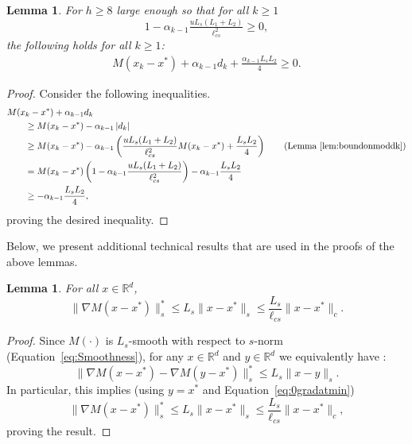\documentclass{article}
\newcommand{\lrp}[1]{\left( #1 \right)}
\newcommand{\abs}[1]{\left|{#1}\right|}
\newcommand{\R}{\mathbb{R}}
\newcommand{\lcs}{\ell_{cs}}
\newtheorem{lemma}[theorem]{Lemma}
\begin{document}
\begin{lemma}\label{lem:nonnegLyapunov} For $h \ge 8$ large enough so that for all $k\ge 1$
\[ 1 - \alpha_{k-1}\tfrac{uL_s(L_1+L_2)}{\lcs^2} \ge 0, \]
the following holds for all $k\ge 1$: 
    \begin{align*}
        M(x_k - x^*) + \alpha_{k-1} d_k + \tfrac{\alpha_{k-1}L_sL_2}{4} \ge 0.
    \end{align*}
\end{lemma}
\begin{proof}
    Consider the following inequalities.
    \begin{align*}
        &M(x_k - x^*) + \alpha_{k-1} d_k \\
        &\qquad \ge M(x_k - x^*) - \alpha_{k-1} \abs{d_k}\\
        &\qquad \ge M(x_k - x^*)  - \alpha_{k-1} \lrp{\frac{uL_s(L_1+L_2)}{\lcs^2} M(x_k-x^*) + \frac{L_sL_2}{4}} \tag{Lemma~\ref{lem:boundonmoddk}} \\
        &\qquad = M(x_k - x^*)\lrp{1 - \alpha_{k-1}\frac{uL_s(L_1+L_2)}{\lcs^2}} -\alpha_{k-1}\frac{L_sL_2}{4}\\
        &\qquad \ge -\alpha_{k-1}\frac{L_sL_2}{4},
    \end{align*}
    proving the desired inequality. 
\end{proof}

Below, we present additional technical results that are used in the proofs of the above lemmas. 

\begin{lemma}\label{lem:gradMsbound} For all $x\in\R^d$, 
    \[ \|\nabla M(x - x^*) \|^*_s \le L_s\|x - x^*\|_s \le \frac{L_s}{\lcs} \|x-x^*\|_c. \]
\end{lemma}
\begin{proof}
    Since $M(\cdot)$ is $L_s$-smooth with respect to $s$-norm (Equation~\eqref{eq:Smoothness}), for any $x\in \R^d$ and $y\in\R^d$ we equivalently have \citep[Chapter 5]{beck2017first}:
    \[ \|\nabla M(x - x^*) - \nabla M(y - x^*) \|^*_s  \le L_s\|x-y\|_s.\]
In particular, this implies (using $y=x^*$ and Equation~\eqref{eq:0gradatmin}) 
\[ \|\nabla M(x - x^*) \|^*_s \le L_s\|x - x^*\|_s \le \frac{L_s}{\lcs} \|x -x^*\|_c, \]
proving the result.
\end{proof}
\end{document}
